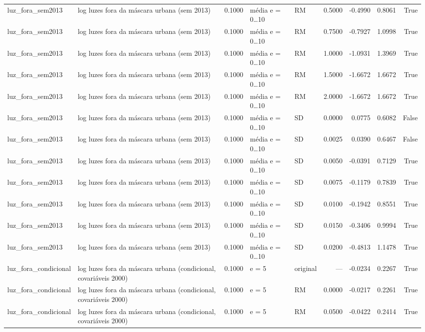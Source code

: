 \begin{table}
{\begin{tabular}{llrllrrrr}
luz\_fora\_sem2013 & log luzes fora da máscara urbana (sem 2013) & 0.1000 & média e = 0…10 & RM & 0.5000 & -0.4990 & 0.8061 & True \\
luz\_fora\_sem2013 & log luzes fora da máscara urbana (sem 2013) & 0.1000 & média e = 0…10 & RM & 0.7500 & -0.7927 & 1.0998 & True \\
luz\_fora\_sem2013 & log luzes fora da máscara urbana (sem 2013) & 0.1000 & média e = 0…10 & RM & 1.0000 & -1.0931 & 1.3969 & True \\
luz\_fora\_sem2013 & log luzes fora da máscara urbana (sem 2013) & 0.1000 & média e = 0…10 & RM & 1.5000 & -1.6672 & 1.6672 & True \\
luz\_fora\_sem2013 & log luzes fora da máscara urbana (sem 2013) & 0.1000 & média e = 0…10 & RM & 2.0000 & -1.6672 & 1.6672 & True \\
luz\_fora\_sem2013 & log luzes fora da máscara urbana (sem 2013) & 0.1000 & média e = 0…10 & SD & 0.0000 & 0.0775 & 0.6082 & False \\
luz\_fora\_sem2013 & log luzes fora da máscara urbana (sem 2013) & 0.1000 & média e = 0…10 & SD & 0.0025 & 0.0390 & 0.6467 & False \\
luz\_fora\_sem2013 & log luzes fora da máscara urbana (sem 2013) & 0.1000 & média e = 0…10 & SD & 0.0050 & -0.0391 & 0.7129 & True \\
luz\_fora\_sem2013 & log luzes fora da máscara urbana (sem 2013) & 0.1000 & média e = 0…10 & SD & 0.0075 & -0.1179 & 0.7839 & True \\
luz\_fora\_sem2013 & log luzes fora da máscara urbana (sem 2013) & 0.1000 & média e = 0…10 & SD & 0.0100 & -0.1942 & 0.8551 & True \\
luz\_fora\_sem2013 & log luzes fora da máscara urbana (sem 2013) & 0.1000 & média e = 0…10 & SD & 0.0150 & -0.3406 & 0.9994 & True \\
luz\_fora\_sem2013 & log luzes fora da máscara urbana (sem 2013) & 0.1000 & média e = 0…10 & SD & 0.0200 & -0.4813 & 1.1478 & True \\
luz\_fora\_condicional & log luzes fora da máscara urbana (condicional, covariáveis 2000) & 0.1000 & e = 5 & original & — & -0.0234 & 0.2267 & True \\
luz\_fora\_condicional & log luzes fora da máscara urbana (condicional, covariáveis 2000) & 0.1000 & e = 5 & RM & 0.0000 & -0.0217 & 0.2261 & True \\
luz\_fora\_condicional & log luzes fora da máscara urbana (condicional, covariáveis 2000) & 0.1000 & e = 5 & RM & 0.0500 & -0.0422 & 0.2414 & True \\

\end{tabular}}
\end{table}
